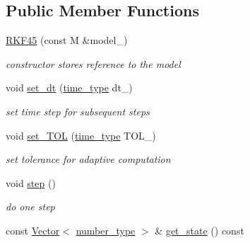 \subsection*{Public Member Functions}
\begin{DoxyCompactItemize}
\item 
\hypertarget{classhdnum_1_1RKF45_a7757b93351fc2a2a98fe503ef92dbe3b}{
\hyperlink{classhdnum_1_1RKF45_a7757b93351fc2a2a98fe503ef92dbe3b}{RKF45} (const M \&model\_\-)}
\label{classhdnum_1_1RKF45_a7757b93351fc2a2a98fe503ef92dbe3b}

\begin{DoxyCompactList}\small\item\em constructor stores reference to the model \item\end{DoxyCompactList}\item 
\hypertarget{classhdnum_1_1RKF45_aa0724f83cd7bb44451e21b1780b3f100}{
void \hyperlink{classhdnum_1_1RKF45_aa0724f83cd7bb44451e21b1780b3f100}{set\_\-dt} (\hyperlink{classhdnum_1_1RKF45_a27ab73a7d7756f59d4422a96afd9ea00}{time\_\-type} dt\_\-)}
\label{classhdnum_1_1RKF45_aa0724f83cd7bb44451e21b1780b3f100}

\begin{DoxyCompactList}\small\item\em set time step for subsequent steps \item\end{DoxyCompactList}\item 
\hypertarget{classhdnum_1_1RKF45_ac5c815988db76d77a28e1833dd6a6cb6}{
void \hyperlink{classhdnum_1_1RKF45_ac5c815988db76d77a28e1833dd6a6cb6}{set\_\-TOL} (\hyperlink{classhdnum_1_1RKF45_a27ab73a7d7756f59d4422a96afd9ea00}{time\_\-type} TOL\_\-)}
\label{classhdnum_1_1RKF45_ac5c815988db76d77a28e1833dd6a6cb6}

\begin{DoxyCompactList}\small\item\em set tolerance for adaptive computation \item\end{DoxyCompactList}\item 
\hypertarget{classhdnum_1_1RKF45_aa61bd540faf3b35e42788e5127a2ecf1}{
void \hyperlink{classhdnum_1_1RKF45_aa61bd540faf3b35e42788e5127a2ecf1}{step} ()}
\label{classhdnum_1_1RKF45_aa61bd540faf3b35e42788e5127a2ecf1}

\begin{DoxyCompactList}\small\item\em do one step \item\end{DoxyCompactList}\item 
\hypertarget{classhdnum_1_1RKF45_a13ea82e111ab9e30fd9b6faf5e825e3d}{
const \hyperlink{classhdnum_1_1Vector}{Vector}$<$ \hyperlink{classhdnum_1_1RKF45_af34f11a4cdc46bb0323db78fcb3712da}{number\_\-type} $>$ \& \hyperlink{classhdnum_1_1RKF45_a13ea82e111ab9e30fd9b6faf5e825e3d}{get\_\-state} () const }
\label{classhdnum_1_1RKF45_a13ea82e111ab9e30fd9b6faf5e825e3d}


\end{DoxyCompactItemize}

